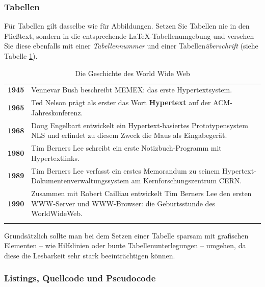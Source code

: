 \subsubsection{Tabellen}
Für Tabellen gilt dasselbe wie für Abbildungen.
Setzen Sie Tabellen nie in den Fließtext, sondern in die entsprechende \LaTeX-Tabellenumgebung und versehen Sie diese ebenfalls mit einer {\em Tabellennummer} und einer Tabellen{\em überschrift} (siehe Tabelle \ref{tab_HistoryWWW}).

\begin{table}
\caption{Die Geschichte des World Wide Web}
\begin{tabular}{rp{12cm}} \noalign{\smallskip} \hline \noalign{\smallskip}
{\bf 1945} & Vennevar Bush\index{Bush, Vennevar} beschreibt MEMEX\index{MEMEX}: das erste Hypertextsystem.\\
{\bf 1965} & Ted Nelson\index{Nelson, Ted} prägt als erster das Wort {\bf Hypertext}\index{Hypertext} auf der ACM-Jahreskonferenz.\\
{\bf 1968} & Doug Engelbart\index{Englebart, Douglas C.} entwickelt ein Hypertext-basiertes Prototypensystem NLS und erfindet zu diesem Zweck die Maus als Eingabegerät.\\
{\bf 1980} & Tim Berners Lee\index{Lee, Tim Berners} schreibt ein erste Notizbuch-Programm mit Hypertextlinks.\\
{\bf 1989} & Tim Berners Lee verfasst ein erstes Memorandum zu seinem Hypertext-Dokumentenverwaltungssystem am Kernforschungszentrum CERN.\\
{\bf 1990} & Zusammen mit Robert Cailliau\index{Cailliau, Robert} entwickelt Tim Berners Lee den ersten WWW-Server\index{Server} und WWW-Browser\index{Browser}: die Geburtsstunde des WorldWideWeb.\\  \noalign{\smallskip} \hline
\end{tabular}
\label{tab_HistoryWWW}
\end{table}

\noindent
Grundsätzlich sollte man bei dem Setzen einer Tabelle sparsam mit grafischen Elementen -- wie Hilfslinien oder bunte Tabellenunterlegungen -- umgehen, da diese die Lesbarkeit sehr stark beeinträchtigen können.


\subsubsection{Listings, Quellcode und Pseudocode}

